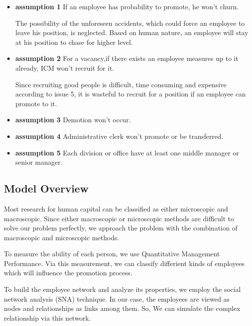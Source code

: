 \documentclass[12pt,a4paper,titlepage]{article}
\begin{document}
\begin{itemize}
\item \textbf{assumption 1} If an employee has probability to
  promote, he won't churn.

The possibility of the unforeseen accidents, which could force an
employee to leave his position, is neglected. Based on human nature,
an employee will stay at his position to chase for higher level.

\item \textbf{assumption 2} For a vacancy,if there exists an
  employee measures up to it already, ICM won't recruit for it.

Since recruiting good people is difficult, time consuming and
expensive according to issue 5, it is wasteful to recruit for a
position if an employee can promote to it.

\item \textbf{assumption 3} Demotion won't occur.

\item \textbf{assumption 4} Administrative clerk won't promote or be
  transferred.

\item \textbf{assumption 5} Each division or office have at least one
  middle manager or senior manager.

\end{itemize}

\subsection{Model Overview}
\label{sec:model-overview}

Most research for human capital can be classified as either
microscopic and macroscopic. Since either macroscopic or microscopic
methods are difficult to solve our problem perfectly, we approach the
problem with the combination of macroscopic and microscopic methods.

To measure the ability of each person, we use Quantitative Management
Performance. Via this measurement, we can classify differient kinds of
employees which will influence the promotion process.

To build the employee network and analyze its properties, we employ
the social network analysis (SNA) technique. In our case, the
employees are viewed as nodes and relationships as links among
them. So, We can simulate the complex relationship via this network.
\end{document}
